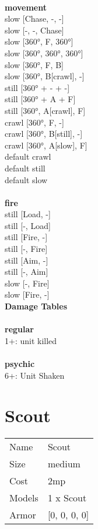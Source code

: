 \ \\ {\bf movement } \\
slow [Chase, -, -] \\
slow [-, -, Chase] \\
slow [360°, F, 360°] \\
slow [360°, 360°, 360°] \\
slow [360°, F, B] \\
slow [360°, B[crawl], -] \\
still [360° + - + -] \\
still [360° + A + F] \\
still [360°, A[crawl], F] \\
crawl [360°, F, -] \\
crawl [360°, B[still], -] \\
crawl [360°, A[slow], F] \\
default crawl \\
default still \\
default slow \\
\ \\ {\bf fire } \\
still [Load, -] \\
still [-, Load] \\
still [Fire, -] \\
still [-, Fire] \\
still [Aim, -] \\
still [-, Aim] \\
slow [-, Fire] \\
slow [Fire, -] \\


{\bf Damage Tables} \\
\ \\ {\bf regular } \\
1+: unit killed \\
\ \\ {\bf psychic } \\
6+: Unit Shaken \\










\pagebreak\pagebreak

\section{ Scout }

\begin{tabular}{ll}
  Name & Scout \\
  Size & medium\\
  Cost & 2mp\\
  Models & 1 x Scout\\
  Armor & [0, 0, 0, 0]\\
\end{tabular}

